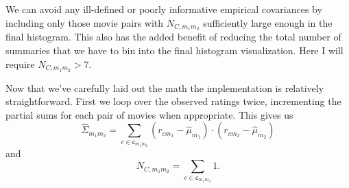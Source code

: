 \documentclass[
  letterpaper,
  DIV=11,
  numbers=noendperiod]{scrartcl}
\begin{document}
We can avoid any ill-defined or poorly informative empirical covariances
by including only those movie pairs with \(N_{C, m_{1} m_{2}}\)
sufficiently large enough in the final histogram. This also has the
added benefit of reducing the total number of summaries that we have to
bin into the final histogram visualization. Here I will require
\(N_{C, m_{1} m_{2}} > 7\).

Now that we've carefully laid out the math the implementation is
relatively straightforward. First we loop over the observed ratings
twice, incrementing the partial sums for each pair of movies when
appropriate. This gives us \[
\hat{\Sigma}_{m_{1} m_{2}}
=
\sum_{c \in \mathsf{c}_{m_{1} m_{2}}}
(r_{c m_{1}} - \hat{\mu}_{m_{1}}) \cdot
(r_{c m_{2}} - \hat{\mu}_{m_{2}})
\] and \[
N_{C, m_{1} m_{2}}
=
\sum_{c \in \mathsf{c}_{m_{1} m_{2}}} 1.
\]
\end{document}
